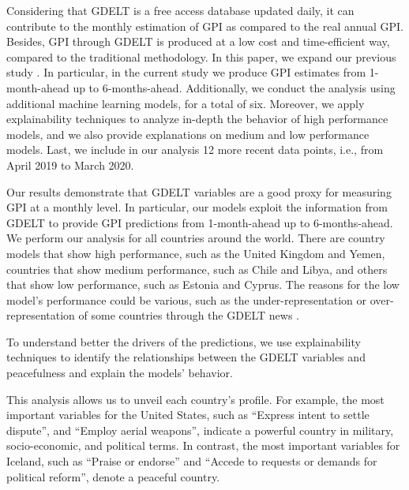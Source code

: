 \documentclass{bmcart}
\begin{document}
Considering that GDELT is a free access database updated daily, it can contribute to the monthly estimation of GPI as compared to the real annual GPI. Besides, GPI through GDELT is produced at a low cost and time-efficient way, compared to the traditional methodology.  
In this paper, we expand our previous study  \cite{voukelatou2020estimating}. In particular, in the current study we produce GPI estimates from 1-month-ahead up to 6-months-ahead. Additionally, we conduct the analysis using additional machine learning models, for a total of six. Moreover, we apply explainability techniques to analyze in-depth the behavior of high performance models, and we also provide explanations on medium and low performance models. Last, we include in our analysis 12 more recent data points, i.e., from April 2019 to March 2020.

Our results demonstrate that GDELT variables are a good proxy for measuring GPI at a monthly level. In particular, our models exploit the information from GDELT to provide GPI predictions from 1-month-ahead up to 6-months-ahead. 
We perform our analysis for all countries around the world. There are country models that show high performance, such as the United Kingdom and Yemen, countries that show medium performance, such as Chile and Libya, and others that show low performance, such as Estonia and Cyprus. The reasons for the low model's performance could be various, such as the under-representation or over-representation of some countries through the GDELT news \cite{kwak2014first}. 

To understand better the drivers of the predictions, we use explainability techniques \cite{guidotti2018survey, lundberg2018consistent,lundberg2017unified} to identify the relationships between the GDELT variables and peacefulness and explain the models' behavior. 

This analysis allows us to unveil each country's profile. 
For example, the most important variables for the United States, such as ``Express intent to settle dispute'', and ``Employ aerial weapons'', indicate a powerful country in military, socio-economic, and political terms. In contrast, the most important variables for Iceland, such as ``Praise or endorse'' and ``Accede to requests or demands for political reform'', denote a peaceful country.

\end{document}
